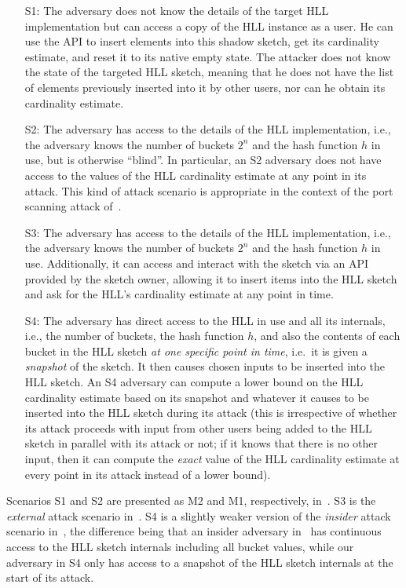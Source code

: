 \documentclass[11pt]{article}
\begin{document}
\begin{itemize}
\item[S1:] The adversary does not know the details of the target HLL implementation but can access a copy of the HLL instance as a user. He can use the API to insert elements into this shadow sketch, get its cardinality estimate, and reset it to its native empty state. The attacker does not know the state of the targeted HLL sketch, meaning that he does not have the list of elements previously inserted into it by other users, nor can he obtain its cardinality estimate.
\item[S2:] The adversary has access to the details of the HLL implementation, i.e., the adversary knows the number of buckets $2^n$ and the hash function $h$ in use, but is otherwise ``blind''. In particular, an S2 adversary does not have access to the values of the HLL cardinality estimate at any point in its attack. This kind of attack scenario is appropriate in the context of the port scanning attack of~\cite{portscanhll}.
\item[S3:] The adversary has access to the details of the HLL implementation, i.e., the adversary knows the number of buckets $2^n$ and the hash function $h$ in use. Additionally, it can access and interact with the sketch via an API provided by the sketch owner, allowing it to insert items into the HLL sketch and ask for the HLL's cardinality estimate at any point in time.
\item[S4:] The adversary has direct access to the HLL in use and all its internals, i.e., the number of buckets, the hash function $h$, and also the contents of each bucket in the HLL sketch \emph{at one specific point in time}, i.e.\ it is given a \emph{snapshot} of the sketch. It then causes chosen inputs to be inserted into the HLL sketch. An S4 adversary can compute a lower bound on the HLL cardinality estimate based on its snapshot and whatever it causes to be inserted into the HLL sketch during its attack (this is irrespective of whether its attack proceeds with input from other users being added to the HLL sketch in parallel with its attack or not; if it knows that there is no other input, then it can compute the \emph{exact} value of the HLL cardinality estimate at every point in its attack instead of a lower bound).
\end{itemize}

Scenarios S1 and S2 are presented as M2 and M1, respectively, in~\cite{hllvuln}. S3 is the \textit{external} attack scenario in~\cite{cardestprivacy}. S4 is a slightly weaker version of the \textit{insider} attack scenario in~\cite{cardestprivacy}, the difference being that an insider adversary in~\cite{cardestprivacy} has continuous access to the HLL sketch internals including all bucket values, while our adversary in S4 only has access to a snapshot of the HLL sketch internals at the start of its attack.
\end{document}
